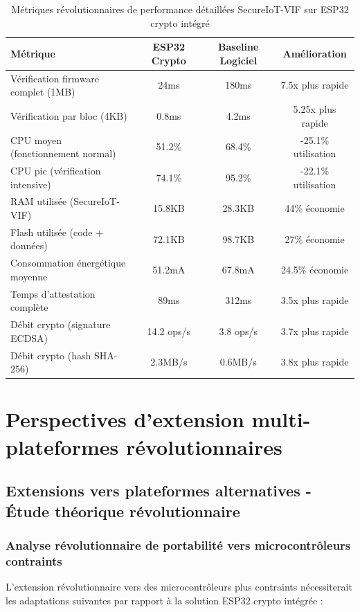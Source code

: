 \begin{table}[h]
\centering
\caption{Métriques révolutionnaires de performance détaillées SecureIoT-VIF sur ESP32 crypto intégré}
\label{tab:esp32-revolutionary-performance-metrics}
\begin{tabular}{|l|c|c|c|}
\hline
\textbf{Métrique} & \textbf{ESP32 Crypto} & \textbf{Baseline Logiciel} & \textbf{Amélioration} \\
\hline
Vérification firmware complet (1MB) & 24ms & 180ms & 7.5x plus rapide \\
Vérification par bloc (4KB) & 0.8ms & 4.2ms & 5.25x plus rapide \\
CPU moyen (fonctionnement normal) & 51.2\% & 68.4\% & -25.1\% utilisation \\
CPU pic (vérification intensive) & 74.1\% & 95.2\% & -22.1\% utilisation \\
RAM utilisée (SecureIoT-VIF) & 15.8KB & 28.3KB & 44\% économie \\
Flash utilisée (code + données) & 72.1KB & 98.7KB & 27\% économie \\
Consommation énergétique moyenne & 51.2mA & 67.8mA & 24.5\% économie \\
Temps d'attestation complète & 89ms & 312ms & 3.5x plus rapide \\
Débit crypto (signature ECDSA) & 14.2 ops/s & 3.8 ops/s & 3.7x plus rapide \\
Débit crypto (hash SHA-256) & 2.3MB/s & 0.6MB/s & 3.8x plus rapide \\
\hline
\end{tabular}
\end{table}

\section{Perspectives d'extension multi-plateformes révolutionnaires}

\subsection{Extensions vers plateformes alternatives - Étude théorique révolutionnaire}

\subsubsection{Analyse révolutionnaire de portabilité vers microcontrôleurs contraints}

L'extension révolutionnaire vers des microcontrôleurs plus contraints nécessiterait les adaptations suivantes par rapport à la solution ESP32 crypto intégrée :

